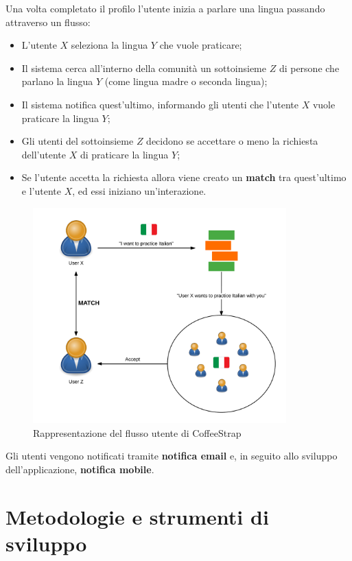 Una volta completato il profilo l'utente inizia a parlare una lingua passando attraverso un flusso:

\begin{itemize}

\item L'utente $X$ seleziona la lingua $Y$ che vuole praticare;
\item Il sistema cerca all'interno della comunità un sottoinsieme $Z$ di persone che parlano la lingua $Y$ (come lingua madre o seconda lingua);
\item Il sistema notifica quest'ultimo, informando gli utenti che l'utente $X$ vuole praticare la lingua $Y$;
\item Gli utenti del sottoinsieme $Z$ decidono se accettare o meno la richiesta dell'utente $X$ di praticare la lingua $Y$;
\item Se l'utente accetta la richiesta allora viene creato un \textbf{match} tra quest'ultimo e l'utente $X$, ed essi iniziano un'interazione.

\end{itemize}

\begin{figure}[htpd]
\centering
\includegraphics[width=9.75cm]{../immagini/coffeestrap-flow}
\caption{Rappresentazione del flusso utente di CoffeeStrap}
\end{figure}

Gli utenti vengono notificati tramite \textbf{notifica email} e, in seguito allo sviluppo dell'applicazione, \textbf{notifica mobile}.

\section{Metodologie e strumenti di sviluppo}


